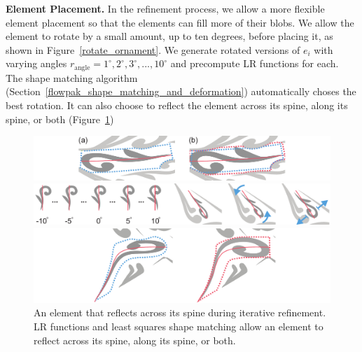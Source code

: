 \textbf{Element Placement.}
In the refinement process, we allow a more flexible element placement so that
the elements can fill more of their blobs.  We allow the element
to rotate by a small amount, up to ten degrees, before placing it, as shown in
Figure~\ref{rotate_ornament}. 
We generate rotated versions of $e_{i}$ 
with varying angles $r_\mathrm{angle} = {1^{\circ}, 2^{\circ}, 3^{\circ}, ..., 10^{\circ}}$
and precompute LR functions for each. The shape matching algorithm
(Section~\ref{flowpak_shape_matching_and_deformation}) automatically choses the best rotation. It
can also choose to reflect the element across its spine, along its spine, or both (Figure~\ref{flip_shape})

\begin{figure}
\centering
\includegraphics[width=1.0\textwidth]{figures/flowpak/stretch.pdf}
\caption[Enlarge an element]
{\label{stretch_ornament}
(a) An element with its sub-region blob shown in dashed blue line. Note that any blob is constrained by the neighboring elements. 
(b) The dashed red line is the grown blob, which accommodates an enlarged element.}

\bigskip
\includegraphics[width=1.0\textwidth]{figures/flowpak/rotate_ornament.pdf}
\caption[Rotate an element]
{\label{rotate_ornament}
Top row: rotated versions of the original element. 
         The best rotation angle is chosen via least squares matching.
         Bottom row: original, rotated, and enlarged versions of an element.}
\bigskip

\includegraphics[width=1.0\textwidth]{figures/flowpak/flip.pdf}
\caption[Flip an element]
{\label{flip_shape}
An element that reflects across its spine during iterative refinement.
LR functions and least squares shape matching allow an element to reflect
across its spine, along its spine, or both.}
\end{figure}

